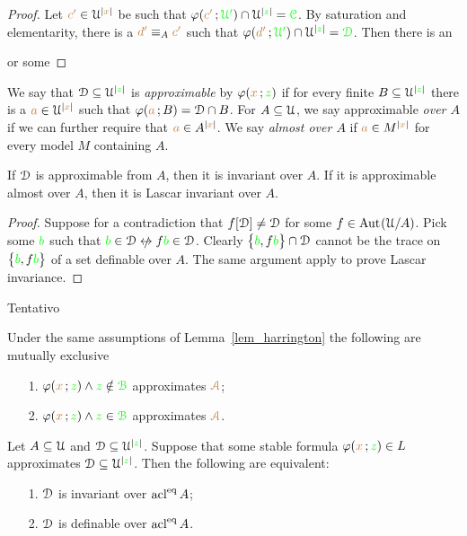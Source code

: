 \documentclass[creche.tex]{subfiles}
\begin{document}
{\begin{proof}
Let ${\color{brown} c'}\in\EuScript U^{|{\color{brown} x}|}$ be such that $\varphi({\color{brown} c'}\,;{\color{green}\EuScript U'})\cap\EuScript U^{|{\color{green} z}|}={\color{green}\EuScript C}$. By saturation and elementarity, there is a ${\color{brown} d'}\equiv_A{\color{brown} c'}$ such that $\varphi({\color{brown} d'}\,;{\color{green}\EuScript U'})\cap\EuScript U^{|{\color{green} z}|}={\color{green}\EuScript D}$. Then there is an 

or some 
\end{proof}


We say that $\EuScript D\subseteq\EuScript U^{|{\color{green} z}|}$ is \emph{approximable\/} by $\varphi({\color{brown} x}\,;{\color{green} z})$ if for every finite $B\subseteq\EuScript U^{|{\color{green} z}|}$ there is a ${\color{brown} a}\in\EuScript U^{|{\color{brown} x}|}$ such that $\varphi({\color{brown} a}\,;B)=\EuScript D\cap B$. For $A\subseteq\EuScript U$, we say approximable \emph{over $A$\/} if we can further require that ${\color{brown} a}\in A^{|{\color{brown} x}|}$. We say \emph{almost over $A$\/} if  ${\color{brown} a}\in M^{|{\color{brown} x}|}$ for every model $M$ containing $A$.

\begin{proposition}
If\/ $\EuScript D$ is\/ approximable from $A$, then it is invariant over $A$. If it is\/ ap\-prox\-i\-ma\-ble almost over $A$, then it is Lascar invariant over $A$.
\end{proposition}

\begin{proof}
Suppose for a contradiction that $f[\EuScript D]\neq\EuScript D$ for some $f\in\textrm{Aut\kern.15ex}(\EuScript U/A)$. Pick some ${\color{green} b}$ such that ${\gr b}\in\D\niff f{\gr b}\in\D$. Clearly $\big\{{\color{green} b},f{\color{green} b}\big\}\cap\EuScript D$ cannot be the trace on $\big\{{\color{green} b},f{\color{green} b}\big\}$ of a set definable over $A$. The same argument apply to prove Lascar invariance.
\end{proof}

Tentativo


\begin{corollary}
Under the same assumptions of Lemma~\ref{lem_harrington} the following are mutually exclusive\nobreak
\begin{itemize}
\item[1.] $\varphi({\color{brown} x}\,;{\color{green} z})\wedge{\color{green}z}\notin{{\color{green}{\EuScript B}}}$ approximates ${\color{brown}\EuScript A}$;
\item[2.] $\varphi({\color{brown} x}\,;{\color{green} z})\wedge{\color{green}z}\in{{\color{green}{\EuScript B}}}$ approximates ${\color{brown}\EuScript A}$.\QED
\end{itemize}
\end{corollary}

}

\begin{proposition}
Let $A\subseteq\EuScript U$ and $\EuScript D\subseteq\EuScript U^{|{\color{green} z}|}$. Suppose that some stable formula $\varphi({\color{brown} x}\,;{\color{green} z})\in L$ approximates $\EuScript D\subseteq\EuScript U^{|{\color{green} z}|}$. Then the following are equivalent:
\begin{itemize}
\item[1.] $\EuScript D$ is invariant over $\mathop{\rm acl}^{{\rm eq}} A$;
\item[2.] $\EuScript D$ is definable over $\mathop{\rm acl}^{{\rm eq}} A$.
\end{itemize}
\end{proposition}
\end{document}
